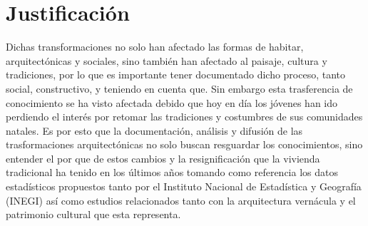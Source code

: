 \section{Justificación}
Dichas transformaciones no solo han afectado las formas de habitar, arquitectónicas y sociales, sino también han afectado al paisaje, cultura y tradiciones, por lo que es importante tener documentado dicho proceso, tanto social, constructivo, y teniendo en cuenta que. Sin embargo esta trasferencia de conocimiento se ha visto afectada debido que hoy en día los jóvenes han ido perdiendo el interés por retomar las tradiciones y costumbres de sus comunidades natales. Es por esto que la documentación, análisis y difusión de las trasformaciones arquitectónicas no solo buscan resguardar los conocimientos, sino entender el por que de estos cambios y la resignificación que la vivienda tradicional ha tenido en los últimos años tomando como referencia los datos estadísticos propuestos tanto por el Instituto Nacional de Estadística y Geografía (INEGI) así como estudios relacionados tanto con la arquitectura vernácula y el patrimonio cultural que esta representa.
